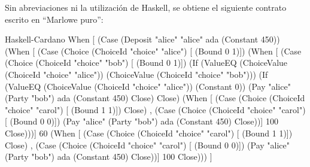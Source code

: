\documentclass[12pt]{book}
\begin{document}
Sin abreviaciones ni la utilización de Haskell, se obtiene el siguiente contrato escrito en ``Marlowe puro'':

\begin{code}[title=Contrato \textit{Escrow} completamente expandido.]{Haskell-Cardano}
When [
  (Case
     (Deposit
        "alice" "alice" ada
        (Constant 450))
     (When [
           (Case
              (Choice
                 (ChoiceId "choice" "alice") [
                 (Bound 0 1)])
              (When [
                 (Case
                    (Choice
                       (ChoiceId "choice" "bob") [
                       (Bound 0 1)])
                    (If
                       (ValueEQ
                          (ChoiceValue
                             (ChoiceId "choice" "alice"))
                          (ChoiceValue
                             (ChoiceId "choice" "bob")))
                       (If
                          (ValueEQ
                             (ChoiceValue
                                (ChoiceId "choice" "alice"))
                             (Constant 0))
                          (Pay
                             "alice"
                             (Party "bob") ada
                             (Constant 450) Close) Close)
                       (When [
                             (Case
                                (Choice
                                   (ChoiceId "choice" "carol") [
                                   (Bound 1 1)]) Close)
                             ,
                             (Case
                                (Choice
                                   (ChoiceId "choice" "carol") [
                                   (Bound 0 0)])
                                (Pay
                                   "alice"
                                   (Party "bob") ada
                                   (Constant 450) Close))] 100 Close)))] 60
                 (When [
                       (Case
                          (Choice
                             (ChoiceId "choice" "carol") [
                             (Bound 1 1)]) Close)
                       ,
                       (Case
                          (Choice
                             (ChoiceId "choice" "carol") [
                             (Bound 0 0)])
                          (Pay
                             "alice"
                             (Party "bob") ada
                             (Constant 450) Close))] 100 Close)))
      ]
\end{code}
\end{document}
